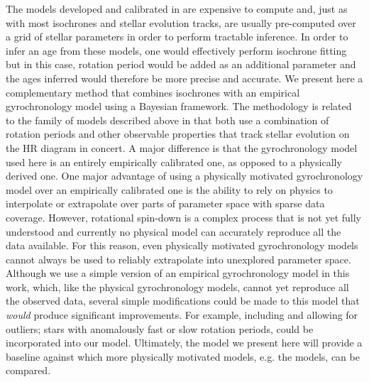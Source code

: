 The models developed and calibrated in \citet{epstein2014, vansaders2015,
vansaders2016, vansaders2018} are expensive to compute and, just as with most
isochrones and stellar evolution tracks, are usually pre-computed over a grid
of stellar parameters in order to perform tractable inference.
In order to infer an age from these models, one would effectively perform
isochrone fitting but in this case, rotation period would be added as an
additional parameter and the ages inferred would therefore be more precise and
accurate.
We present here a complementary method that combines isochrones with an
empirical gyrochronology model using a Bayesian framework.
The methodology is related to the family of models described above in that
both use a combination of rotation periods and other observable properties
that track stellar evolution on the HR diagram in concert.
A major difference is that the gyrochronology model used here is an entirely
empirically calibrated one, as opposed to a physically derived one.
One major advantage of using a physically motivated gyrochronology model over
an empirically calibrated one is the ability to rely on physics to interpolate
or extrapolate over parts of parameter space with sparse data coverage.
However, rotational spin-down is a complex process that is not yet fully
understood and currently no physical model can accurately reproduce all the
data available.
For this reason, even physically motivated gyrochronology models cannot always
be used to reliably extrapolate into unexplored parameter space.
Although we use a simple version of an empirical gyrochronology model in this
work, which, like the physical gyrochronology models, cannot yet reproduce all
the observed data, several simple modifications could be made to this model
that {\it would} produce significant improvements.
For example, including and allowing for outliers; stars with anomalously fast
or slow rotation periods, could be incorporated into our model.
Ultimately, the model we present here will provide a baseline against which
more physically motivated models, e.g. the \citet{vansaders2016} models, can
be compared.


